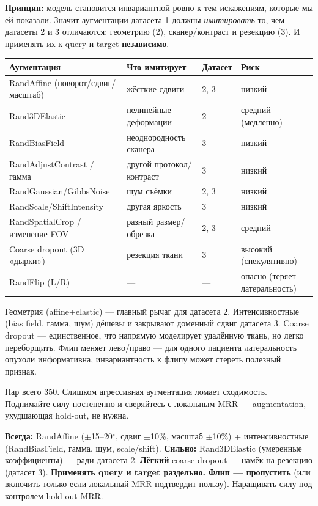 \documentclass[11pt,a4paper]{article}
\begin{document}
\textbf{Принцип:} модель становится инвариантной ровно к тем искажениям, которые мы ей показали.
Значит аугментации датасета 1 должны \emph{имитировать} то, чем датасеты 2 и 3 отличаются:
геометрию (2), сканер/контраст и резекцию (3). И применять их к query и target \textbf{независимо}.

\begin{center}\small
\begin{tabularx}{\linewidth}{@{}l X l l@{}}\toprule
\textbf{Аугментация} & \textbf{Что имитирует} & \textbf{Датасет} & \textbf{Риск}\\\midrule
RandAffine (поворот/сдвиг/масштаб) & жёсткие сдвиги & 2, 3 & низкий\\
Rand3DElastic & нелинейные деформации & 2 & средний (медленно)\\
RandBiasField & неоднородность сканера & 3 & низкий\\
RandAdjustContrast / гамма & другой протокол/контраст & 3 & низкий\\
RandGaussian/GibbsNoise & шум съёмки & 2, 3 & низкий\\
RandScale/ShiftIntensity & другая яркость & 3 & низкий\\
RandSpatialCrop / изменение FOV & разный размер/обрезка & 2, 3 & средний\\
Coarse dropout (3D «дырки») & резекция ткани & 3 & высокий (спекулятивно)\\
RandFlip (L/R) & --- & --- & опасно (теряет латеральность)\\
\bottomrule\end{tabularx}\end{center}

\begin{note}
Геометрия (affine+elastic) — главный рычаг для датасета 2. Интенсивностные (bias field, гамма,
шум) дёшевы и закрывают доменный сдвиг датасета 3. Coarse dropout — единственное, что напрямую
моделирует удалённую ткань, но легко переборщить. Флип меняет лево/право — для одного пациента
латеральность опухоли информативна, инвариантность к флипу может стереть полезный признак.
\end{note}

\begin{tradeoff}
Пар всего 350. Слишком агрессивная аугментация ломает сходимость. Поднимайте силу постепенно и
сверяйтесь с локальным MRR — augmentation, ухудшающая hold-out, не нужна.
\end{tradeoff}

\begin{compression}
\textbf{Всегда:} RandAffine ($\pm$15--20$^\circ$, сдвиг $\pm$10\%, масштаб $\pm$10\%) +
интенсивностные (RandBiasField, гамма, шум, scale/shift). \textbf{Сильно:} Rand3DElastic
(умеренные коэффициенты) — ради датасета 2. \textbf{Лёгкий} coarse dropout — намёк на резекцию
(датасет 3). \textbf{Применять query и target раздельно.} \textbf{Флип — пропустить} (или включить
только если локальный MRR подтвердит пользу). Наращивать силу под контролем hold-out MRR.
\end{compression}
\end{document}
